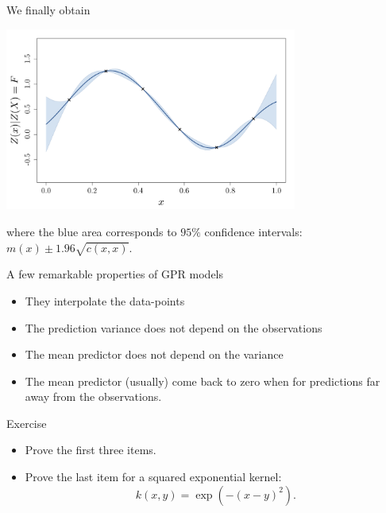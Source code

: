 \documentclass{beamer}
\begin{document}
\begin{frame}{}
We finally obtain
\begin{center}
\includegraphics[height=6cm]{figures/R/GPR_GaussGPR}
\end{center}
where the blue area corresponds to $95\%$ confidence intervals: $m(x) \pm 1.96 \sqrt{c(x,x)}$. 
\end{frame}

\begin{frame}{}
A few remarkable properties of GPR models 
\begin{itemize}
	\item They interpolate the data-points
	\item The prediction variance does not depend on the observations
	\item The mean predictor does not depend on the variance
	\item The mean predictor (usually) come back to zero when for predictions far away from the observations.
\end{itemize}
\vspace{5mm}
\begin{exampleblock}{Exercise}
\begin{itemize}
	\item Prove the first three items.
	\item Prove the last item for a squared exponential kernel: 
	$$k(x,y) = \exp \left(- (x-y)^2 \right).$$
\end{itemize}
\end{exampleblock}
\end{frame}

\end{document}
